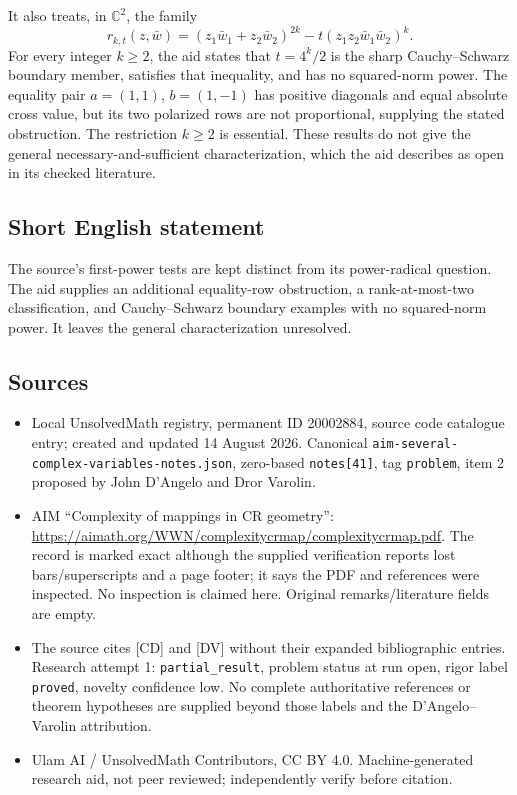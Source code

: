 \documentclass[11pt]{article}
\newcommand{\C}{\mathbb{C}}
\begin{document}
It also treats, in $\C^2$, the family
\[
 r_{k,t}(z,\bar w)=(z_1\bar w_1+z_2\bar w_2)^{2k}
 -t(z_1z_2\bar w_1\bar w_2)^k.
\]
For every integer $k\ge2$, the aid states that $t=4^k/2$ is the sharp Cauchy--Schwarz boundary member, satisfies that inequality, and has no squared-norm power. The equality pair $a=(1,1)$, $b=(1,-1)$ has positive diagonals and equal absolute cross value, but its two polarized rows are not proportional, supplying the stated obstruction. The restriction $k\ge2$ is essential. These results do not give the general necessary-and-sufficient characterization, which the aid describes as open in its checked literature.
\subsection{Short English statement}
The source's first-power tests are kept distinct from its power-radical question. The aid supplies an additional equality-row obstruction, a rank-at-most-two classification, and Cauchy–Schwarz boundary examples with no squared-norm power. It leaves the general characterization unresolved.
\subsection{Sources}
\begin{itemize}
\item Local UnsolvedMath registry, permanent ID 20002884, source code catalogue entry; created and updated 14 August 2026. Canonical \texttt{aim-several-complex-variables-notes.json}, zero-based \texttt{notes[41]}, tag \texttt{problem}, item 2 proposed by John D'Angelo and Dror Varolin.
\item AIM ``Complexity of mappings in CR geometry'': \url{https://aimath.org/WWN/complexitycrmap/complexitycrmap.pdf}. The record is marked exact although the supplied verification reports lost bars/superscripts and a page footer; it says the PDF and references were inspected. No inspection is claimed here. Original remarks/literature fields are empty.
\item The source cites [CD] and [DV] without their expanded bibliographic entries. Research attempt 1: \texttt{partial\_result}, problem status at run open, rigor label \texttt{proved}, novelty confidence low. No complete authoritative references or theorem hypotheses are supplied beyond those labels and the D'Angelo--Varolin attribution.
\item Ulam AI / UnsolvedMath Contributors, CC BY 4.0. Machine-generated research aid, not peer reviewed; independently verify before citation.
\end{itemize}
\end{document}
